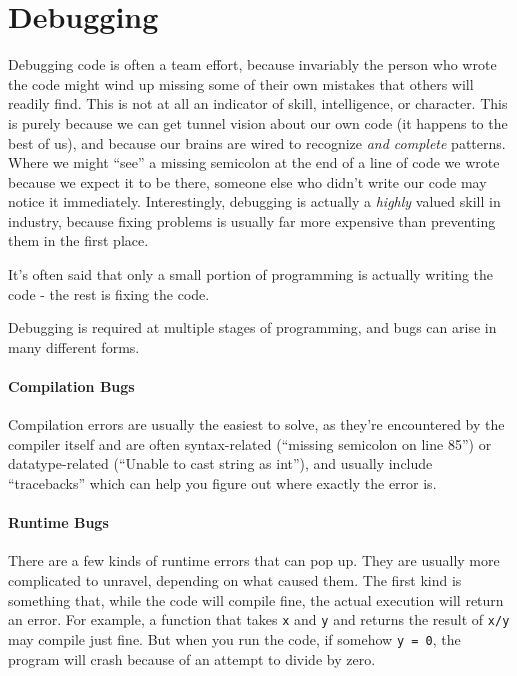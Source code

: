 \section{Debugging}
Debugging code is often a team effort, because invariably the person who wrote the code might wind up missing some of their own mistakes that others will readily find. 
This is not at all an indicator of skill, intelligence, or character. 
This is purely because we can get tunnel vision about our own code (it happens to the best of us), and because our brains are wired to recognize \emph{and complete} patterns.
Where we might ``see'' a missing semicolon at the end of a line of code we wrote because we expect it to be there, someone else who didn't write our code may notice it immediately. 
Interestingly, debugging is actually a \emph{highly} valued skill in industry, because fixing problems is usually far more expensive than preventing them in the first place.

It's often said that only a small portion of programming is actually
writing the code - the rest is fixing the code.

Debugging is required at multiple stages of programming, and bugs can
arise in many different forms.

\hypertarget{compilation-bugs}{%
\paragraph{Compilation Bugs}\label{compilation-bugs}}

Compilation errors are usually the easiest to solve, as they're
encountered by the compiler itself and are often syntax-related
(``missing semicolon on line 85'') or datatype-related (``Unable to cast
string as int''), and usually include ``tracebacks'' which can help you
figure out where exactly the error is.

\hypertarget{runtime-bugs}{%
\paragraph{Runtime Bugs}\label{runtime-bugs}}

There are a few kinds of runtime errors that can pop up. They are
usually more complicated to unravel, depending on what caused them. The
first kind is something that, while the code will compile fine, the
actual execution will return an error. For example, a function that
takes \texttt{x} and \texttt{y} and returns the result of \texttt{x/y}
may compile just fine. But when you run the code, if somehow
\texttt{y\ =\ 0}, the program will crash because of an attempt to divide
by zero.

